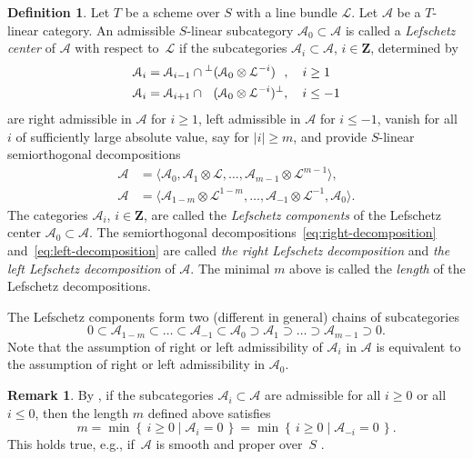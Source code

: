 \documentclass[11pt, reqno]{amsart}
\numberwithin{equation}{section}
\theoremstyle{plain}
\theoremstyle{definition}
\newtheorem{definition}[theorem]{Definition}
\newtheorem{remark}[theorem]{Remark}
\newcommand{\st}{\mid}
\newcommand{\set}[1]{\left\{ \, #1 \, \right\}}
\newcommand{\cA}{\mathcal{A}}
\newcommand{\cL}{\mathcal{L}}
\newcommand{\bZ}{\mathbf{Z}}
\begin{document}
\begin{definition}
\label{definition:lefschetz-category}
Let $T$ be a scheme over $S$ with a line bundle $\cL$.
Let $\cA$ be a $T$-linear category. 
An admissible
{$S$-linear} subcategory $\cA_0 \subset \cA$ is called a \emph{Lefschetz center} of $\cA$ with respect to~$\cL$ 
if the subcategories $\cA_i \subset \cA$, $i \in \bZ$, determined by 
\begin{align}
\label{Ai-igeq0}
\cA_i & = \cA_{i-1} \cap {}^\perp(\cA_0 \otimes \cL^{-i})\hphantom{{}^\perp}, \quad 
i \ge 1 \\ 
\label{Ai-ileq0}
\cA_i & = \cA_{i+1} \cap \hphantom{{}^\perp}(\cA_0 \otimes \cL^{-i})^\perp, \quad 
i \le -1 
\end{align} 
are right admissible in $\cA$ for $i \geq 1$, left admissible in $\cA$ for $i \leq -1$,  
vanish for all $i$ of sufficiently large absolute value, say for $|i| \geq m$, and 
provide {$S$-linear} semiorthogonal decompositions 
\begin{align}
\label{eq:right-decomposition}
\cA & = \langle \cA_0, \cA_1 \otimes \cL, \dots, \cA_{m-1} \otimes \cL^{m-1} \rangle, \\ 
\label{eq:left-decomposition}
\cA & = \langle \cA_{1-m} \otimes \cL^{1-m}, \dots, \cA_{-1} \otimes \cL^{-1}, \cA_0 \rangle. 
\end{align} 
The categories $\cA_i$, $i \in \bZ$, are called the \emph{Lefschetz components} of the Lefschetz center $\cA_0 \subset \cA$. 
The semiorthogonal decompositions~\eqref{eq:right-decomposition} 
and~\eqref{eq:left-decomposition} are called \emph{the right Lefschetz decomposition} and 
\emph{the left Lefschetz decomposition} of $\cA$. 
The minimal $m$ above is called the \emph{length} of the Lefschetz decompositions. 
\end{definition}

The Lefschetz components form two (different in general) chains of subcategories
\begin{equation}
\label{eq:lefschetz-chain}
0 \subset \cA_{1-m} \subset \dots \subset \cA_{-1} \subset \cA_0 \supset \cA_1 \supset \dots \supset \cA_{m-1} \supset 0.
\end{equation} 
Note that the assumption of right or left admissibility of $\cA_i$ in $\cA$ 
is equivalent to the assumption of right or left admissibility in $\cA_0$. 


\begin{remark}
By \cite[Lemma 6.3]{NCHPD}, if the subcategories $\cA_i \subset \cA$ are admissible 
for all $i \geq 0$ or all $i \leq 0$, then the length $m$ defined above satisfies 
\begin{equation*}
m = \min \set{ i \geq 0 \st \cA_{i} = 0 } = \min \set{ i \geq 0 \st \cA_{-i} = 0 } . 
\end{equation*}
This holds true, e.g., if~$\cA$ is smooth and proper over~$S$ \cite[Lemma 4.15]{NCHPD}. 
\end{remark}
\end{document}
